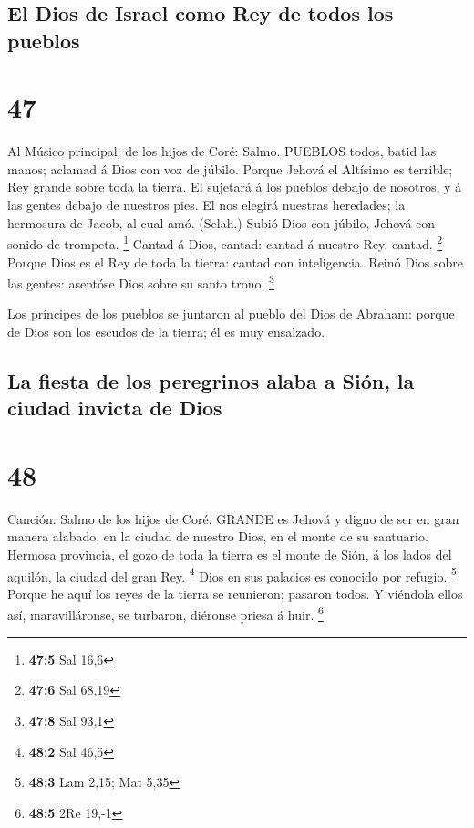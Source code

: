 \hypertarget{el-dios-de-israel-como-rey-de-todos-los-pueblos}{%
\subsection{El Dios de Israel como Rey de todos los
pueblos}\label{el-dios-de-israel-como-rey-de-todos-los-pueblos}}

\hypertarget{section-46}{%
\section{47}\label{section-46}}

 Al Músico principal: de los hijos de Coré: Salmo. PUEBLOS
todos, batid las manos; aclamad á Dios con voz de júbilo. 
Porque Jehová el Altísimo es terrible; Rey grande sobre toda la tierra.
 El sujetará á los pueblos debajo de nosotros, y á las
gentes debajo de nuestros pies.  El nos elegirá nuestras
heredades; la hermosura de Jacob, al cual amó. (Selah.) 
Subió Dios con júbilo, Jehová con sonido de trompeta. \footnote{\textbf{47:5}
  Sal 16,6}  Cantad á Dios, cantad: cantad á nuestro Rey,
cantad. \footnote{\textbf{47:6} Sal 68,19}  Porque Dios es
el Rey de toda la tierra: cantad con inteligencia.  Reinó
Dios sobre las gentes: asentóse Dios sobre su santo trono. \footnote{\textbf{47:8}
  Sal 93,1}

 Los príncipes de los pueblos se juntaron al pueblo del Dios
de Abraham: porque de Dios son los escudos de la tierra; él es muy
ensalzado.

\hypertarget{la-fiesta-de-los-peregrinos-alaba-a-siuxf3n-la-ciudad-invicta-de-dios}{%
\subsection{La fiesta de los peregrinos alaba a Sión, la ciudad invicta
de
Dios}\label{la-fiesta-de-los-peregrinos-alaba-a-siuxf3n-la-ciudad-invicta-de-dios}}

\hypertarget{section-47}{%
\section{48}\label{section-47}}

 Canción: Salmo de los hijos de Coré. GRANDE es Jehová y
digno de ser en gran manera alabado, en la ciudad de nuestro Dios, en el
monte de su santuario.  Hermosa provincia, el gozo de toda
la tierra es el monte de Sión, á los lados del aquilón, la ciudad del
gran Rey. \footnote{\textbf{48:2} Sal 46,5}  Dios en sus
palacios es conocido por refugio. \footnote{\textbf{48:3} Lam 2,15; Mat
  5,35}  Porque he aquí los reyes de la tierra se reunieron;
pasaron todos.  Y viéndola ellos así, maravilláronse, se
turbaron, diéronse priesa á huir. \footnote{\textbf{48:5} 2Re 19,-1}

